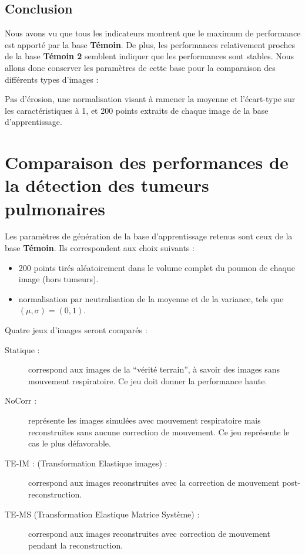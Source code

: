\subsection{Conclusion}

Nous avons vu que tous les indicateurs montrent que le maximum de performance est apporté par la base \textbf{Témoin}. De plus, les  performances relativement proches de la base \textbf{Témoin 2} semblent indiquer que les performances sont stables. Nous allons donc conserver les paramètres de cette base pour la comparaison des différents types d'images :

Pas d'érosion, une normalisation visant à ramener la moyenne et l'écart-type sur les caractéristiques à 1, et 200 points extraits de chaque image de la base d'apprentissage.
 

\FloatBarrier

\section{Comparaison des performances de la détection des tumeurs pulmonaires}

Les paramètres de génération de la base d'apprentissage retenus sont ceux de la base \textbf{Témoin}. Ils correspondent aux choix suivants :

\begin{itemize}
 \item 200 points tirés aléatoirement dans le volume complet du poumon de chaque image (hors tumeurs).
 \item normalisation par neutralisation de la moyenne et de la variance, tels que $(\mu, \sigma) = (0,1)$.
\end{itemize}


Quatre jeux d'images seront comparés :

\begin{description}
 \item[Statique :] correspond aux images de la ``vérité terrain'', à savoir des images sans mouvement respiratoire. Ce jeu doit donner la performance haute.  
\item[NoCorr :] représente les images simulées avec mouvement respiratoire mais reconstruites sans aucune correction de mouvement. Ce jeu représente le cas le plus défavorable. 
 \item [TE-IM : (Transformation Elastique images) :] correspond aux images reconstruites avec la correction de mouvement post-reconstruction.
 \item [TE-MS (Transformation Elastique Matrice Système) :] correspond aux images reconstruites avec correction de mouvement pendant la reconstruction.
\end{description}


